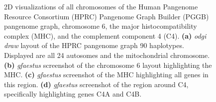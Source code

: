 \begin{figure}[!htb]
\begin{subfigure}{1.0\textwidth}
	\label{fig:sfig4}
\end{subfigure}	
	\caption{2D visualizations of all chromosomes of the Human Pangenome Resource Consortium (HPRC) Pangenome Graph Builder (PGGB) pangenome graph, chromosome 6, the major histocompatibility complex (MHC), and the complement component 4 (C4). \textbf{(a)} \textit{odgi draw} layout of the HPRC pangenome graph 90 haplotypes. Displayed are all 24 autosomes and the mitochondrial chromosome. \textbf{(b)} \textit{gfaestus} screenshot of the chromosome 6 layout highlighting the MHC. \textbf{(c)} \textit{gfaestus} screenshot of the MHC highlighting all genes in this region. \textbf{(d)} \textit{gfaestus} screenshot of the region around C4, specifically highlighting genes C4A and C4B.}
	\label{fig:2d_layouts}
\end{figure}